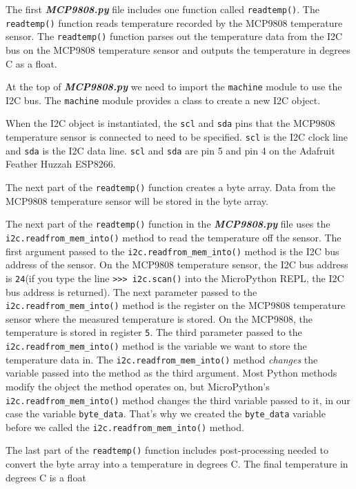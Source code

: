 \documentclass{book}
\begin{document}
    
        The first \textbf{\emph{MCP9808.py}} file includes one function called
\lstinline!readtemp()!. The \lstinline!readtemp()! function reads
temperature recorded by the MCP9808 temperature sensor. The
\lstinline!readtemp()! function parses out the temperature data from the
I2C bus on the MCP9808 temperature sensor and outputs the temperature in
degrees C as a float.

At the top of \textbf{\emph{MCP9808.py}} we need to import the
\lstinline!machine! module to use the I2C bus. The \lstinline!machine!
module provides a class to create a new I2C object.

When the I2C object is instantiated, the \lstinline!scl! and
\lstinline!sda! pins that the MCP9808 temperature sensor is connected to
need to be specified. \lstinline!scl! is the I2C clock line and
\lstinline!sda! is the I2C data line. \lstinline!scl! and
\lstinline!sda! are pin 5 and pin 4 on the Adafruit Feather Huzzah
ESP8266.

The next part of the \lstinline!readtemp()! function creates a byte
array. Data from the MCP9808 temperature sensor will be stored in the
byte array.

The next part of the \lstinline!readtemp()! function in the
\textbf{\emph{MCP9808.py}} file uses the
\lstinline!i2c.readfrom_mem_into()! method to read the temperature off
the sensor. The first argument passed to the
\lstinline!i2c.readfrom_mem_into()! method is the I2C bus address of the
sensor. On the MCP9808 temperature sensor, the I2C bus address is
\lstinline!24!(if you type the line \lstinline!>>> i2c.scan()! into the
MicroPython REPL, the I2C bus address is returned). The next parameter
passed to the \lstinline!i2c.readfrom_mem_into()! method is the register
on the MCP9808 temperature sensor where the measured temperature is
stored. On the MCP9808, the temperature is stored in register
\lstinline!5!. The third parameter passed to the
\lstinline!i2c.readfrom_mem_into()! method is the variable we want to
store the temperature data in. The \lstinline!i2c.readfrom_mem_into()!
method \emph{changes} the variable passed into the method as the third
argument. Most Python methods modify the object the method operates on,
but MicroPython's \lstinline!i2c.readfrom_mem_into()! method changes the
third variable passed to it, in our case the variable
\lstinline!byte_data!. That's why we created the \lstinline!byte_data!
variable before we called the \lstinline!i2c.readfrom_mem_into()!
method.

The last part of the \lstinline!readtemp()! function includes
post-processing needed to convert the byte array into a temperature in
degrees C. The final temperature in degrees C is a float
    
\end{document}
